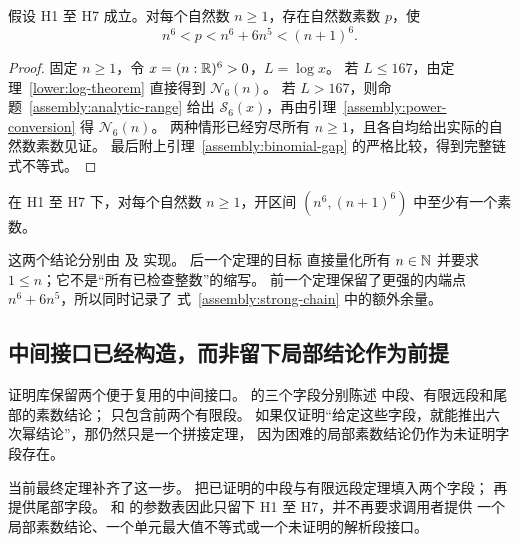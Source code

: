 \begin{theorem}[七个明确输入下的六次幂短区间定理]
\label{assembly:main-short}
假设 H1 至 H7 成立。对每个自然数 $n\geq1$，存在自然数素数 $p$，使
\begin{equation}\label{assembly:strong-chain}
 n^6<p<n^6+6n^5<(n+1)^6.
\end{equation}
\end{theorem}

\begin{proof}
固定 $n\geq1$，令 $x=(n:\mathbb R)^6>0$，$L=\log x$。
若 $L\leq167$，由定理~\ref{lower:log-theorem} 直接得到
$\mathcal N_6(n)$。
若 $L>167$，则命题~\ref{assembly:analytic-range} 给出
$\mathcal S_6(x)$，再由引理~\ref{assembly:power-conversion} 得
$\mathcal N_6(n)$。
两种情形已经穷尽所有 $n\geq1$，且各自均给出实际的自然数素数见证。
最后附上引理~\ref{assembly:binomial-gap} 的严格比较，得到完整链式不等式。
\end{proof}

\begin{corollary}[六次幂之间的素数]\label{assembly:sixth-powers}
在 H1 至 H7 下，对每个自然数 $n\geq1$，开区间
$(n^6,(n+1)^6)$ 中至少有一个素数。
\end{corollary}

这两个结论分别由
 及
 实现。
后一个定理的目标
直接量化所有 $n\in\mathbb N$ 并要求 $1\leq n$；它不是“所有已检查整数”的缩写。
前一个定理保留了更强的内端点 $n^6+6n^5$，所以同时记录了
式~\eqref{assembly:strong-chain} 中的额外余量。

\subsection{中间接口已经构造，而非留下局部结论作为前提}

证明库保留两个便于复用的中间接口。
 的三个字段分别陈述
中段、有限远段和尾部的素数结论；
只包含前两个有限段。
如果仅证明“给定这些字段，就能推出六次幂结论”，那仍然只是一个拼接定理，
因为困难的局部素数结论仍作为未证明字段存在。

当前最终定理补齐了这一步。
把已证明的中段与有限远段定理填入两个字段；
再提供尾部字段。
和 
的参数表因此只留下 H1 至 H7，并不再要求调用者提供
一个局部素数结论、一个单元最大值不等式或一个未证明的解析段接口。

